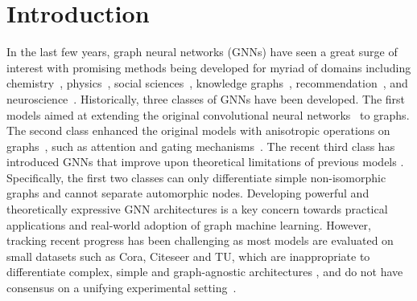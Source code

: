 \documentclass{article}
\begin{document}
\section{Introduction}
In the last few years, graph neural networks (GNNs) have seen a great surge of interest with promising methods being developed for myriad of domains including chemistry~\cite{duvenaud2015convolutional,gilmer2017neural}, physics~\cite{cranmer2019learning,sanchez2020learning}, social sciences~\cite{kipf2017semi,monti2019fake}, knowledge graphs~\cite{schlichtkrull2018modeling,chami2020low}, recommendation~\cite{monti2017geometric,ying2018graph}, and neuroscience~\cite{griffa2017transient}. 
Historically, three classes of GNNs have been developed. The first models \cite{art:ScarselliGoriTsoiHagenbuchnerMonfardini09,bruna2013spectral,NIPS2016_6081,NIPS2016_6398,kipf2017semi,hamilton2017inductive} aimed at extending the original convolutional neural networks~\cite{lecun1995convolutional,lecun1998gradient} to graphs. 
The second class enhanced the original models with {anisotropic} operations on graphs~\cite{perona1990scale}, such as attention and gating mechanisms~\cite{battaglia2016interaction,marcheggiani2017encoding,Monti_2017,velickovic2018graph,bresson2017residual}.
The recent third class has introduced GNNs that improve upon theoretical limitations of previous models \cite{xu2018how,morris2019weisfeiler,maron2019provably,chen2019equivalence,murphy2019relational,srinivasan2019equivalence}. 
Specifically, the first two classes can only differentiate
simple non-isomorphic graphs and cannot separate automorphic nodes.
Developing powerful and theoretically expressive GNN architectures is a key concern towards practical applications and real-world adoption of graph machine learning.
However, tracking recent progress has been challenging as most models are evaluated on small 
datasets such as Cora, Citeseer and TU, which are inappropriate to differentiate complex, simple and graph-agnostic architectures \cite{Hoang2019RevisitingGN,chen2019powerful}, and do not have consensus on a unifying experimental setting~\cite{errica2019fair,hu2020ogb}.
\end{document}

